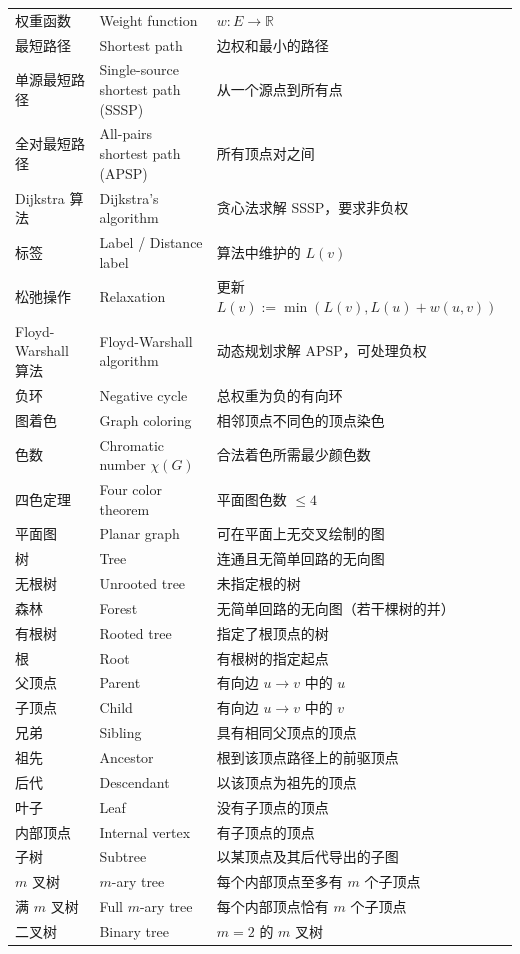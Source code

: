 \documentclass[UTF8,11pt,a4paper]{ctexbook}   %
\theoremstyle{definition}
\begin{document}
\begin{longtable}{|p{4.8cm}|p{4.8cm}|p{4.8cm}|}
权重函数 & Weight function & $w:E\to\mathbb{R}$ \\
最短路径 & Shortest path & 边权和最小的路径 \\
单源最短路径 & Single-source shortest path (SSSP) & 从一个源点到所有点 \\
全对最短路径 & All-pairs shortest path (APSP) & 所有顶点对之间 \\
Dijkstra 算法 & Dijkstra's algorithm & 贪心法求解 SSSP，要求非负权 \\
标签 & Label / Distance label & 算法中维护的 $L(v)$ \\
松弛操作 & Relaxation & 更新 $L(v):=\min(L(v),L(u)+w(u,v))$ \\
Floyd-Warshall 算法 & Floyd-Warshall algorithm & 动态规划求解 APSP，可处理负权 \\
负环 & Negative cycle & 总权重为负的有向环 \\
图着色 & Graph coloring & 相邻顶点不同色的顶点染色 \\
色数 & Chromatic number $\chi(G)$ & 合法着色所需最少颜色数 \\
四色定理 & Four color theorem & 平面图色数 $\le 4$ \\
平面图 & Planar graph & 可在平面上无交叉绘制的图 \\
树 & Tree & 连通且无简单回路的无向图 \\
无根树 & Unrooted tree & 未指定根的树 \\
森林 & Forest & 无简单回路的无向图（若干棵树的并） \\
有根树 & Rooted tree & 指定了根顶点的树 \\
根 & Root & 有根树的指定起点 \\
父顶点 & Parent & 有向边 $u\to v$ 中的 $u$ \\
子顶点 & Child & 有向边 $u\to v$ 中的 $v$ \\
兄弟 & Sibling & 具有相同父顶点的顶点 \\
祖先 & Ancestor & 根到该顶点路径上的前驱顶点 \\
后代 & Descendant & 以该顶点为祖先的顶点 \\
叶子 & Leaf & 没有子顶点的顶点 \\
内部顶点 & Internal vertex & 有子顶点的顶点 \\
子树 & Subtree & 以某顶点及其后代导出的子图 \\
$m$ 叉树 & $m$-ary tree & 每个内部顶点至多有 $m$ 个子顶点 \\
满 $m$ 叉树 & Full $m$-ary tree & 每个内部顶点恰有 $m$ 个子顶点 \\
二叉树 & Binary tree & $m=2$ 的 $m$ 叉树 \\

\end{longtable}
\end{document}
